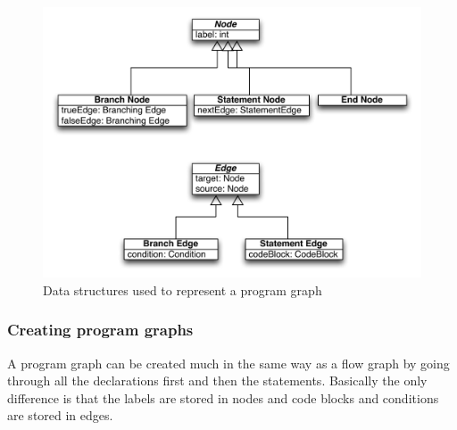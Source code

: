 \begin{figure}[h]
	\centering
	\includegraphics[scale=1.0]{../img/program_graph}
	\caption{Data structures used to represent a program graph}
	\label{fig:programgraph}
\end{figure}

\subsubsection{Creating program graphs}
A program graph can be created much in the same way as a flow graph by going through all the declarations first and then the statements. Basically the only difference is that the labels are stored in nodes and code blocks and conditions are stored in edges.


